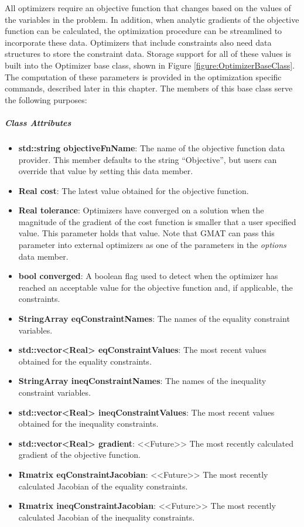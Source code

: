 All optimizers require an objective function that changes based on the values of the variables in
the problem.  In addition, when analytic gradients of the objective function can be calculated, the
optimization procedure can be streamlined to incorporate these data.  Optimizers that include
constraints also need data structures to store the constraint data.  Storage support for all of
these values is built into the Optimizer base class, shown in Figure
\ref{figure:OptimizerBaseClass}.  The computation of these parameters is provided in the
optimization specific commands, described later in this chapter.  The members of this base class
serve the following purposes:

\subparagraph{\textit{Class Attributes}}
\begin{itemize}
\item \textbf{std::string objectiveFnName}: The name of the objective function data provider. This
member defaults to the string ``Objective'', but users can override that value by setting this data
member.
\item \textbf{Real cost}: The latest value obtained for the objective function.
\item \textbf{Real tolerance}: Optimizers have converged on a solution when the magnitude of the
gradient of the cost function is smaller that a user specified value.  This parameter holds that
value.  Note that GMAT can pass this parameter into external optimizers as one of the parameters
in the \textit{options} data member.
\item \textbf{bool converged}: A boolean flag used to detect when the optimizer has reached an
acceptable value for the objective function and, if applicable, the constraints.
\item \textbf{StringArray eqConstraintNames}: The names of the equality constraint variables.
\item \textbf{std::vector<Real> eqConstraintValues}: The most recent values obtained for the
equality constraints.
\item \textbf{StringArray ineqConstraintNames}: The names of the inequality constraint variables.
\item \textbf{std::vector<Real> ineqConstraintValues}: The most recent values obtained for the
inequality constraints.
\item \textbf{std::vector<Real> gradient}: <<Future>> The most recently calculated gradient of the
objective function.
\item \textbf{Rmatrix eqConstraintJacobian}: <<Future>> The most recently calculated Jacobian of the
equality constraints.
\item \textbf{Rmatrix ineqConstraintJacobian}: <<Future>> The most recently calculated Jacobian of
the inequality constraints.
\end{itemize}

